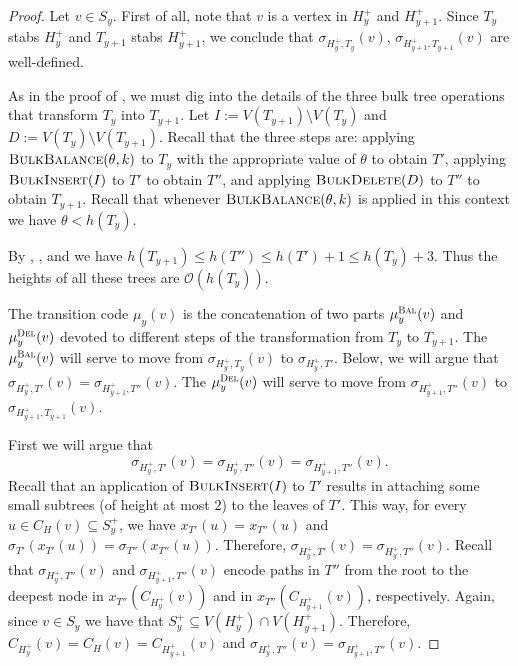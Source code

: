 \documentclass[kpfonts]{patmorin}
\newcommand{\Oh}{\mathcal{O}}
\let\leq\leqslant
\begin{document}
\begin{proof}
  Let $v \in S_y$. 
  First of all, note that $v$ is a vertex in $H^+_y$ and $H^+_{y+1}$.
  Since $T_y$ stabs $H^+_y$ and $T_{y+1}$ stabs $H^+_{y+1}$,
  we conclude that $\sigma_{H^+_{y},T_y}(v)$, $\sigma_{H^+_{y+1},T_{y+1}}(v)$ are well-defined.

  As in the proof of , we must dig into the details of the three bulk tree operations that transform $T_y$ into $T_{y+1}$. 
  Let $I:=V(T_{y+1})\setminus V(T_{y})$ and $D:=V(T_y)\setminus V(T_{y+1})$.
  Recall that the three steps are: 
  applying $\textsc{BulkBalance}(\theta,k)$ to $T_y$ with the appropriate value of $\theta$ to obtain $T'$,
  applying $\textsc{BulkInsert}(I)$ to $T'$ to obtain $T''$, and
  applying $\textsc{BulkDelete}(D)$ to $T''$ to obtain $T_{y+1}$.
  Recall that whenever $\textsc{BulkBalance}(\theta,k)$ is applied in this context we have $\theta < h(T_y)$.


  By , , and  we have  $h(T_{y+1}) \leq h(T'') \leq h(T')+1 \leq h(T_y)+3$.
  Thus the heights of all these trees are $\Oh(h(T_y))$.

  The transition code $\mu_y(v)$ is the concatenation of two parts $\mu_y^{\textsc{Bal}}(v)$ and $\mu_y^{\textsc{Del}}(v)$ devoted to different steps of the transformation from $T_y$ to $T_{y+1}$. 
  The $\mu_y^{\textsc{Bal}}(v)$ will serve to move from $\sigma_{H^+_y,T_y}(v)$ to $\sigma_{H^+_y,T'}$. 
  Below, we will argue that $\sigma_{H^+_y,T'}(v) = \sigma_{H^+_{y+1},T''}(v)$.
  The $\mu_y^{\textsc{Del}}(v)$ will serve to move from $\sigma_{H^+_{y+1},T''}(v)$ to $\sigma_{H^+_{y+1},T_{y+1}}(v)$.

  First we will argue that
  \[
  \sigma_{H^+_{y},T'}(v) = \sigma_{H^+_{y},T''}(v) = \sigma_{H^+_{y+1},T''}(v).
  \]
  Recall that an application of $\textsc{BulkInsert}(I)$ to $T'$ 
  results in attaching some small subtrees (of height at most $2$)
  to the leaves of $T'$. 
  This way, for every $u \in C_H(v) \subseteq S^+_y$, we have $x_{T'}(u) = x_{T''}(u)$ and 
  $\sigma_{T'}(x_{T'}(u)) = \sigma_{T''}(x_{T''}(u))$.
  Therefore, 
  $\sigma_{H^+_{y},T'}(v) =  \sigma_{H^+_{y},T''}(v)$.
  Recall that $\sigma_{H^+_{y},T''}(v)$ and $\sigma_{H^+_{y+1},T''}(v)$ encode paths in $T''$ from the root to the deepest node in $x_{T''}(C_{H^+_{y}}(v))$ and in $x_{T''}(C_{H^+_{y+1}}(v))$, respectively. 
  Again, since $v\in S_y$ we have that $S^+_y \subseteq V(H^+_y) \cap V(H^+_{y+1})$. Therefore, 
  $C_{H^+_{y}}(v) = C_H(v) = C_{H^+_{y+1}}(v)$ and $\sigma_{H^+_{y},T''}(v) =\sigma_{H^+_{y+1},T''}(v)$.


\end{proof}
\end{document}
